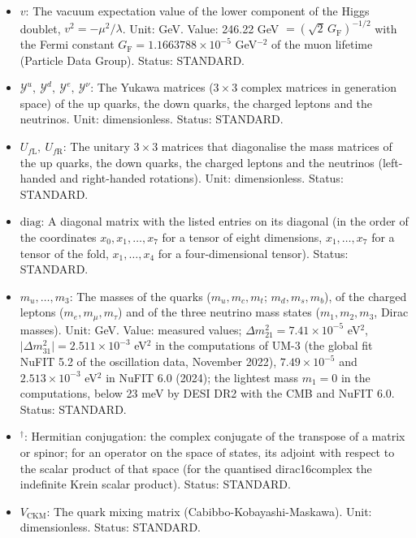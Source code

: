 \documentclass[
  10pt,
]{article}
\providecommand{\tightlist}{%
  \setlength{\itemsep}{0pt}\setlength{\parskip}{0pt}}
\begin{document}
\begin{itemize}
\tightlist
\item
  \(v\): The vacuum expectation value of the lower component of the
  Higgs doublet, \(v^2 = -\mu^2/\lambda\). Unit: GeV. Value: 246.22 GeV
  \(= (\sqrt2\,G_{\mathrm{F}})^{-1/2}\) with the Fermi constant
  \(G_{\mathrm{F}} = 1.1663788\times10^{-5}\) GeV\(^{-2}\) of the muon
  lifetime (Particle Data Group). Status: STANDARD.
\item
  \(\mathcal{Y}^{u},\ \mathcal{Y}^{d},\ \mathcal{Y}^{e},\ \mathcal{Y}^{\nu}\):
  The Yukawa matrices (\(3 \times 3\) complex matrices in generation
  space) of the up quarks, the down quarks, the charged leptons and the
  neutrinos. Unit: dimensionless. Status: STANDARD.
\item
  \(U_{f\mathrm{L}},\ U_{f\mathrm{R}}\): The unitary \(3 \times 3\)
  matrices that diagonalise the mass matrices of the up quarks, the down
  quarks, the charged leptons and the neutrinos (left-handed and
  right-handed rotations). Unit: dimensionless. Status: STANDARD.
\item
  \(\mathrm{diag}\): A diagonal matrix with the listed entries on its
  diagonal (in the order of the coordinates \(x_0, x_1, \dots, x_7\) for
  a tensor of eight dimensions, \(x_1, \dots, x_7\) for a tensor of the
  fold, \(x_1, \dots, x_4\) for a four-dimensional tensor). Status:
  STANDARD.
\item
  \(m_u, \dots, m_3\): The masses of the quarks (\(m_u, m_c, m_t\);
  \(m_d, m_s, m_b\)), of the charged leptons (\(m_e, m_\mu, m_\tau\))
  and of the three neutrino mass states (\(m_1, m_2, m_3\), Dirac
  masses). Unit: GeV. Value: measured values;
  \(\Delta m_{21}^2 = 7.41\times10^{-5}\) eV\(^2\),
  \(\lvert\Delta m_{31}^2\rvert = 2.511\times10^{-3}\) eV\(^2\) in the
  computations of UM-3 (the global fit NuFIT 5.2 of the oscillation
  data, November 2022), \(7.49\times10^{-5}\) and \(2.513\times10^{-3}\)
  eV\(^2\) in NuFIT 6.0 (2024); the lightest mass \(m_1 = 0\) in the
  computations, below 23 meV by DESI DR2 with the CMB and NuFIT 6.0.
  Status: STANDARD.
\item
  \({}^\dagger\): Hermitian conjugation: the complex conjugate of the
  transpose of a matrix or spinor; for an operator on the space of
  states, its adjoint with respect to the scalar product of that space
  (for the quantised dirac16complex the indefinite Krein scalar
  product). Status: STANDARD.
\item
  \(V_{\mathrm{CKM}}\): The quark mixing matrix
  (Cabibbo-Kobayashi-Maskawa). Unit: dimensionless. Status: STANDARD.

\end{itemize}
\end{document}
